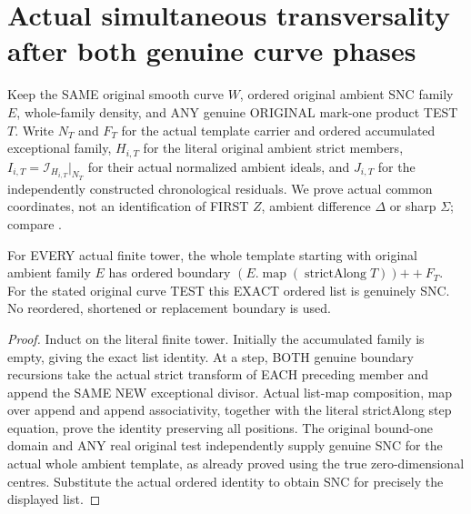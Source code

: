 \section{Actual simultaneous transversality after both genuine curve phases}

Keep the SAME original smooth curve $W$, ordered original ambient SNC
family $E$, whole-family density, and ANY genuine ORIGINAL mark-one product
TEST $T$. Write $N_T$ and $F_T$ for the actual template carrier and
ordered accumulated exceptional family, $H_{i,T}$ for the literal original
ambient strict members, $I_{i,T}=\mathcal I_{H_{i,T}}|_{N_T}$ for their
actual normalized ambient ideals, and $J_{i,T}$ for the independently
constructed chronological residuals. We prove actual common coordinates,
not an identification of FIRST $Z$, ambient difference $\Delta$ or sharp
$\Sigma$; compare \cite[\S12]{bierstone-milman97-invent-math}.

\begin{lemma}
\label{hir:sharp-original-curve-whole-ambient-boundary-ordered-dictionary}
\leanok
For EVERY actual finite tower, the whole template starting with original
ambient family $E$ has ordered boundary
$(E.\operatorname{map}(\operatorname{strictAlong}T))\mathbin{++}F_T$.
For the stated original curve TEST this EXACT ordered list is genuinely
SNC. No reordered, shortened or replacement boundary is used.
\end{lemma}
\begin{proof}
Induct on the literal finite tower. Initially the accumulated family is
empty, giving the exact list identity. At a step, BOTH genuine boundary
recursions take the actual strict transform of EACH preceding member and
append the SAME NEW exceptional divisor. Actual list-map composition,
map over append and append associativity, together with the literal
strictAlong step equation, prove the identity preserving all positions.
The original bound-one domain and ANY real original test independently
supply genuine SNC for the actual whole ambient template, as already
proved using the true zero-dimensional centres. Substitute the actual
ordered identity to obtain SNC for precisely the displayed list.
\end{proof}

